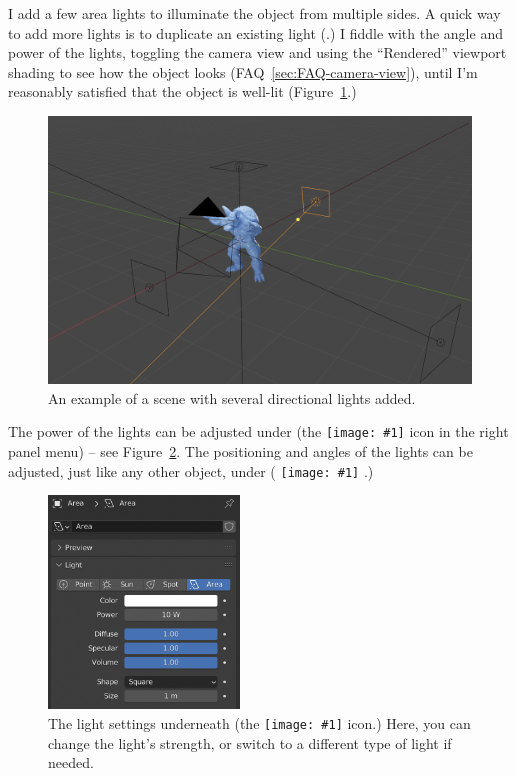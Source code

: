 \documentclass[10pt]{article}
\DeclareRobustCommand{\inlinepic}[1]{%
  \begingroup\normalfont
  \texttt{[image: \#1]}%
  \endgroup
}
\begin{document}
I add a few area lights to illuminate the object from multiple sides. A quick way to add more lights is to duplicate an existing light (.) I fiddle with the angle and power of the lights, toggling the camera view and using the ``Rendered'' viewport shading to see how the object looks (FAQ~\ref{sec:FAQ-camera-view}), until I'm reasonably satisfied that the object is well-lit (Figure~\ref{fig:object-with-directional-lights}.) 
\begin{figure}[H]
    \centering
    \captionsetup{width=0.8\textwidth}
    \includegraphics[width=5in]{images/object-with-directional-lights.png}
    \caption{An example of a scene with several directional lights added.}
    \label{fig:object-with-directional-lights}
\end{figure}

The power of the lights can be adjusted under  (the \inlinepic{images/object-data-properties-light.png} icon in the right panel menu) -- see Figure~\ref{fig:area-light-settings}. The positioning and angles of the lights can be adjusted, just like any other object, under  (\inlinepic{images/object-properties.png}.)

\begin{figure}[H]
    \centering
    \captionsetup{width=0.8\textwidth}
    \includegraphics[width=2in]{images/area-light-settings.png}
    \caption{The light settings underneath  (the \inlinepic{images/object-data-properties-light.png} icon.) Here, you can change the light's strength, or switch to a different type of light if needed. \label{fig:area-light-settings}}
\end{figure}
\end{document}
